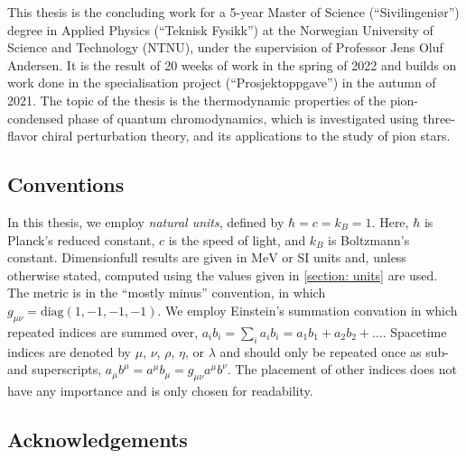 This thesis is the concluding work for a 5-year Master of Science (``Sivilingeniør'') degree in Applied Physics (``Teknisk Fysikk'') at the Norwegian University of Science and Technology (NTNU), under the supervision of Professor Jens Oluf Andersen.
It is the result of 20 weeks of work in the spring of 2022 and builds on work done in the specialisation project (``Prosjektoppgave'') in the autumn of 2021.
The topic of the thesis is the thermodynamic properties of the pion-condensed phase of quantum chromodynamics, which is investigated using three-flavor chiral perturbation theory, and its applications to the study of pion stars.

\subsection*{Conventions}

In this thesis, we employ \emph{natural units}, defined by $\hbar = c = k_B = 1$.
Here, $\hbar$ is Planck's reduced constant, $c$ is the speed of light, and $k_B$ is Boltzmann's constant.
Dimensionfull results are given in $\text{MeV}$ or SI units and, unless otherwise stated, computed using the values given in \autoref{section: units} are used.
The metric is in the ``mostly minus'' convention, in which $g_{\mu \nu} = \text{diag}(1, -1, -1, -1)$.
We employ Einstein's summation convation in which repeated indices are summed over, $a_i b_i = {\sum}_i a_i b_i = a_1 b_1 +  a_2 b_2 +\dots$.
Spacetime indices are denoted by $\mu$, $\nu$, $\rho$, $\eta$, or $\lambda$ and should only be repeated once as sub- and superscripts, $a_\mu b^\mu = a^\mu b_\mu = g_{\mu\nu}a^\mu b^\nu$.
The placement of other indices does not have any importance and is only chosen for readability.


\subsection*{Acknowledgements}



{}